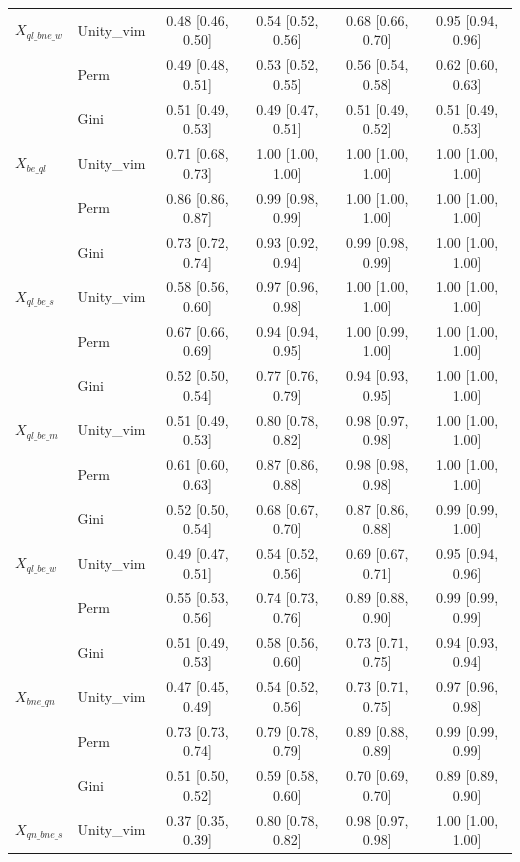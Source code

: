 \begin{tabular}{llcccc}
$X_{ql\_bne\_w}$ & Unity\_vim & 0.48 [0.46, 0.50] & 0.54 [0.52, 0.56] & 0.68 [0.66, 0.70] & 0.95 [0.94, 0.96]\\
 & Perm & 0.49 [0.48, 0.51] & 0.53 [0.52, 0.55] & 0.56 [0.54, 0.58] & 0.62 [0.60, 0.63]\\
 & Gini & 0.51 [0.49, 0.53] & 0.49 [0.47, 0.51] & 0.51 [0.49, 0.52] & 0.51 [0.49, 0.53]\\
$X_{be\_ql}$ & Unity\_vim & 0.71 [0.68, 0.73] & 1.00 [1.00, 1.00] & 1.00 [1.00, 1.00] & 1.00 [1.00, 1.00]\\
 & Perm & 0.86 [0.86, 0.87] & 0.99 [0.98, 0.99] & 1.00 [1.00, 1.00] & 1.00 [1.00, 1.00]\\
 & Gini & 0.73 [0.72, 0.74] & 0.93 [0.92, 0.94] & 0.99 [0.98, 0.99] & 1.00 [1.00, 1.00]\\
$X_{ql\_be\_s}$ & Unity\_vim & 0.58 [0.56, 0.60] & 0.97 [0.96, 0.98] & 1.00 [1.00, 1.00] & 1.00 [1.00, 1.00]\\
 & Perm & 0.67 [0.66, 0.69] & 0.94 [0.94, 0.95] & 1.00 [0.99, 1.00] & 1.00 [1.00, 1.00]\\
 & Gini & 0.52 [0.50, 0.54] & 0.77 [0.76, 0.79] & 0.94 [0.93, 0.95] & 1.00 [1.00, 1.00]\\
$X_{ql\_be\_m}$ & Unity\_vim & 0.51 [0.49, 0.53] & 0.80 [0.78, 0.82] & 0.98 [0.97, 0.98] & 1.00 [1.00, 1.00]\\
 & Perm & 0.61 [0.60, 0.63] & 0.87 [0.86, 0.88] & 0.98 [0.98, 0.98] & 1.00 [1.00, 1.00]\\
 & Gini & 0.52 [0.50, 0.54] & 0.68 [0.67, 0.70] & 0.87 [0.86, 0.88] & 0.99 [0.99, 1.00]\\
$X_{ql\_be\_w}$ & Unity\_vim & 0.49 [0.47, 0.51] & 0.54 [0.52, 0.56] & 0.69 [0.67, 0.71] & 0.95 [0.94, 0.96]\\
 & Perm & 0.55 [0.53, 0.56] & 0.74 [0.73, 0.76] & 0.89 [0.88, 0.90] & 0.99 [0.99, 0.99]\\
 & Gini & 0.51 [0.49, 0.53] & 0.58 [0.56, 0.60] & 0.73 [0.71, 0.75] & 0.94 [0.93, 0.94]\\
$X_{bne\_qn}$ & Unity\_vim & 0.47 [0.45, 0.49] & 0.54 [0.52, 0.56] & 0.73 [0.71, 0.75] & 0.97 [0.96, 0.98]\\
 & Perm & 0.73 [0.73, 0.74] & 0.79 [0.78, 0.79] & 0.89 [0.88, 0.89] & 0.99 [0.99, 0.99]\\
 & Gini & 0.51 [0.50, 0.52] & 0.59 [0.58, 0.60] & 0.70 [0.69, 0.70] & 0.89 [0.89, 0.90]\\
$X_{qn\_bne\_s}$ & Unity\_vim & 0.37 [0.35, 0.39] & 0.80 [0.78, 0.82] & 0.98 [0.97, 0.98] & 1.00 [1.00, 1.00]\\

\end{tabular}
